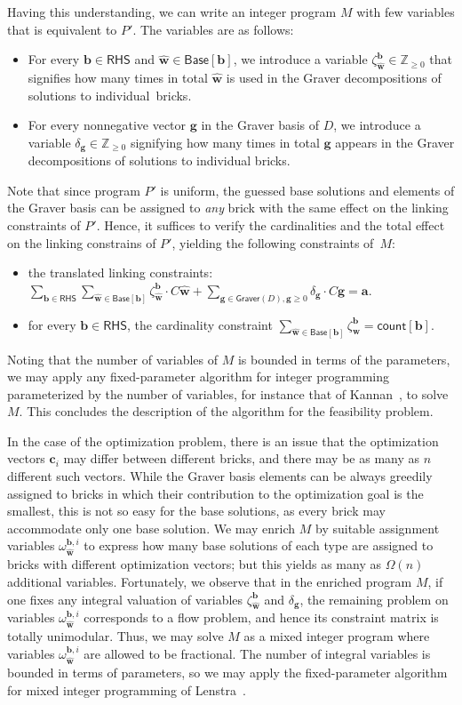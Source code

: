 \documentclass{article}
\renewcommand{\geq}{\geqslant}
\newcommand{\Z}{\mathbb{Z}}
\newcommand{\Zn}{\Z_{\geq 0}}
\newcommand{\tup}[1]{{\mathbf{#1}}}
\newcommand{\ww}{\tup w}
\newcommand{\whww}{{\widehat{\ww}}}
\newcommand{\av}{\tup a}
\newcommand{\bb}{\tup b}
\renewcommand{\gg}{\tup g}
\newcommand{\cc}{\tup c}
\newcommand{\Graver}{\mathsf{Graver}}
\newcommand{\RHS}{\mathsf{RHS}}
\newcommand{\Base}{\mathsf{Base}}
\newcommand{\cntTypes}{\mathsf{count}}
\begin{document}
Having this understanding, we can write an integer program $M$ with few variables that is equivalent to $P'$. The variables are as follows:
\begin{itemize}[nosep]
    \item For every $\bb\in \RHS$ and $\whww\in \Base[\bb]$, we introduce a variable $\zeta^\bb_\whww\in \Zn$ that signifies how many times in total $\whww$ is used in the Graver decompositions of solutions to individual~bricks.
    \item For every nonnegative vector $\gg$ in the Graver basis of $D$, we introduce a variable $\delta_\gg\in \Zn$ signifying how many times in total $\gg$ appears in the Graver decompositions of solutions to individual bricks.
\end{itemize}
Note that since program $P'$ is uniform, the guessed base solutions and elements of the Graver basis can be assigned to {\em{any}} brick with the same effect on the linking constraints of $P'$. Hence, it suffices to verify the cardinalities and the total effect on the linking constrains of $P'$, yielding the following constraints of~$M$:
\begin{itemize}[nosep]
    \item the translated linking constraints: $\sum_{\bb\in \RHS}\sum_{\whww\in \Base[\bb]} \zeta^{\bb}_\whww\cdot C\whww+\sum_{\gg\in \Graver(D), \gg\geq 0} \delta_\gg\cdot C\gg =\av$.
    \item for every $\bb\in \RHS$, the cardinality constraint $\sum_{\whww\in \Base[\bb]}\zeta^\bb_\whww=\cntTypes[\bb]$.
\end{itemize}
Noting that the number of variables of $M$ is bounded in terms of the parameters, we may apply any fixed-parameter algorithm for integer programming parameterized by the number of variables, for instance that of Kannan~\cite{kannan1987minkowski}, to solve $M$. This concludes the description of the algorithm for the feasibility problem.

In the case of the optimization problem, there is an issue that the optimization vectors $\cc_i$ may differ between different bricks, and there may be as many as $n$ different such vectors. While the Graver basis elements can be always greedily assigned to bricks in which their contribution to the optimization goal is the smallest, this is not so easy for the base solutions, as every brick may accommodate only one base solution.
We may enrich $M$ by suitable assignment variables $\omega^{\bb,i}_{\whww}$ to express how many base solutions of each type are assigned to bricks with different optimization vectors; but this yields as many as $\Omega(n)$ additional variables. Fortunately, we observe that in the enriched program $M$, if one fixes any integral valuation of variables $\zeta^{\bb}_{\whww}$ and $\delta_\gg$, the remaining problem on variables $\omega^{\bb,i}_{\whww}$ corresponds to a flow problem, and hence its constraint matrix is totally unimodular. Thus, we may solve $M$ as a mixed integer program where variables $\omega^{\bb,i}_{\whww}$ are allowed to be fractional. The number of integral variables is bounded in terms of parameters, so we may apply the fixed-parameter algorithm for mixed integer programming of Lenstra~\cite{Lenstra1983}.
\end{document}
